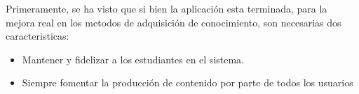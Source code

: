Primeramente, se ha visto que si bien la aplicación esta terminada, para la
mejora real en los metodos de adquisición de conocimiento, son necesarias dos
caracteristicas:

\begin{itemize}
\item Mantener y fidelizar a los estudiantes en el sistema.
\item Siempre fomentar la producción de contenido por parte de todos los
usuarios 
\end{itemize}


